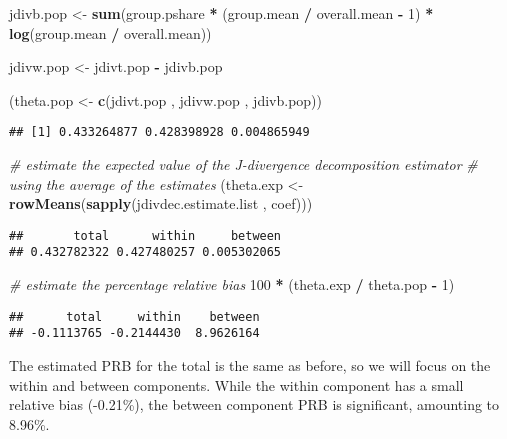 \documentclass[
]{book}
\newenvironment{Shaded}{\begin{snugshade}}{\end{snugshade}}
\newcommand{\CommentTok}[1]{\textcolor[rgb]{0.56,0.35,0.01}{\textit{#1}}}
\newcommand{\DecValTok}[1]{\textcolor[rgb]{0.00,0.00,0.81}{#1}}
\newcommand{\FunctionTok}[1]{\textcolor[rgb]{0.13,0.29,0.53}{\textbf{#1}}}
\newcommand{\NormalTok}[1]{#1}
\newcommand{\OtherTok}[1]{\textcolor[rgb]{0.56,0.35,0.01}{#1}}
\newcommand{\SpecialCharTok}[1]{\textcolor[rgb]{0.81,0.36,0.00}{\textbf{#1}}}
\begin{document}
\begin{Shaded}
\begin{Highlighting}[]
\NormalTok{jdivb.pop }\OtherTok{\textless{}{-}}
  \FunctionTok{sum}\NormalTok{(group.pshare }\SpecialCharTok{*}\NormalTok{ (group.mean }\SpecialCharTok{/}\NormalTok{ overall.mean }\SpecialCharTok{{-}} \DecValTok{1}\NormalTok{) }\SpecialCharTok{*} \FunctionTok{log}\NormalTok{(group.mean }\SpecialCharTok{/}\NormalTok{ overall.mean))}

\NormalTok{jdivw.pop }\OtherTok{\textless{}{-}}\NormalTok{ jdivt.pop }\SpecialCharTok{{-}}\NormalTok{ jdivb.pop}

\NormalTok{(theta.pop }\OtherTok{\textless{}{-}} \FunctionTok{c}\NormalTok{(jdivt.pop , jdivw.pop , jdivb.pop))}
\end{Highlighting}
\end{Shaded}

\begin{verbatim}
## [1] 0.433264877 0.428398928 0.004865949
\end{verbatim}

\begin{Shaded}
\begin{Highlighting}[]
\CommentTok{\# estimate the expected value of the J{-}divergence decomposition estimator}
\CommentTok{\# using the average of the estimates}
\NormalTok{(theta.exp }\OtherTok{\textless{}{-}} \FunctionTok{rowMeans}\NormalTok{(}\FunctionTok{sapply}\NormalTok{(jdivdec.estimate.list , coef)))}
\end{Highlighting}
\end{Shaded}

\begin{verbatim}
##       total      within     between 
## 0.432782322 0.427480257 0.005302065
\end{verbatim}

\begin{Shaded}
\begin{Highlighting}[]
\CommentTok{\# estimate the percentage relative bias}
\DecValTok{100} \SpecialCharTok{*}\NormalTok{ (theta.exp }\SpecialCharTok{/}\NormalTok{ theta.pop }\SpecialCharTok{{-}} \DecValTok{1}\NormalTok{)}
\end{Highlighting}
\end{Shaded}

\begin{verbatim}
##      total     within    between 
## -0.1113765 -0.2144430  8.9626164
\end{verbatim}

The estimated PRB for the total is the same as before, so we will focus on the within and between components. While the within component has a small relative bias (-0.21\%), the between component PRB is significant, amounting to 8.96\%.
\end{document}
